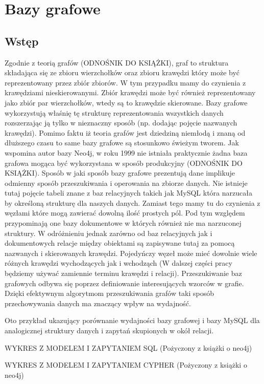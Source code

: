 \documentclass[brudnopis]{xmgr}
\begin{document}
\chapter{Bazy grafowe}

\section{Wstęp}

Zgodnie z teorią grafów (ODNOŚNIK DO KSIĄŻKI), graf to struktura składająca się ze zbioru wierzchołków oraz zbioru krawędzi który może być reprezentowany przez zbiór zbiorów. W tym przypadku mamy do czynienia z krawędziami nieskierowanymi. Zbiór krawędzi może być również reprezentowany jako zbiór par wierzchołków, wtedy są to krawędzie skierowane. Bazy grafowe wykorzystują właśnię tę strukturę reprezentowania wszystkich danych rozszerzając ją tylko w nieznaczny sposób (np. dodając pojęcie nazwanych krawędzi). Pomimo faktu iż teoria grafów jest dziedziną niemłodą i znaną od dłuższego czasu to same bazy grafowe są stosunkowo świeżym tworem. Jak wspomina autor bazy Neo4j, w roku 1999 nie istniała praktycznie żadna baza grafowa mogąca być wykorzystana w sposób produkcyjny (ODNOŚNIK DO KSIĄŻKI). Sposób w jaki sposób bazy grafowe prezentują dane implikuje odmienny sposób przeszukiwania i operowania na zbiorze danych. Nie istnieje tutaj pojęcie tabeli znane z baz relacyjnych takich jak MySQL która narzucała by określoną strukturę dla naszych danych. Zamiast tego mamy tu do czynienia z węzłami które mogą zawierać dowolną ilość prostych pól. Pod tym względem przypominają one bazy dokumentowe w których również nie ma narzuconej struktury. W odróżnieniu jednak zarówno od baz relacyjnych jak i dokumentowych relacje między obiektami są zapisywane tutaj za pomocą nazwanych i skierowanych krawędzi. Pojedyńczy węzeł może mieć dowolnie wiele różnych krawędzi wychodzących jak i wchodząch (W dalszej części pracy będziemy używać zamiennie terminu krawędzi i relacji). Przeszukiwanie baz grafowych odbywa się poprzez definiowanie interesujących wzorców w grafie. Dzięki efektywnym algorytmom przeszukiwania grafów taki sposób przechowywania danych ma znaczący wpływ na wydajność.

Oto przykład ukazujący porównanie wydajności bazy grafowej i bazy MySQL dla analogicznej struktury danych i zapytań skupionych w okół relacji.

WYKRES Z MODELEM I ZAPYTANIEM SQL (Pożyczony z książki o neo4j)

WYKRES Z MODELEM I ZAPYTANIEM CYPHER (Pożyczony z książki o neo4j)
\end{document}

